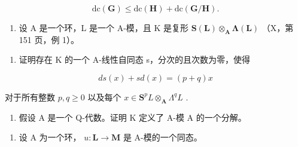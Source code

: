 \[
\mathrm{dc} (\mathbf {G}) \leqslant \mathrm{dc} (\mathbf {H}) + \mathrm{dc} (\mathbf {G} / \mathbf {H}).
\]


\begin{enumerate}
\def\labelenumi{\arabic{enumi})}
\tightlist
\item
  设 A 是一个环，L 是一个 A-模，且 K 是复形 \(\mathbf{S}(\mathbf{L})\otimes_{\mathbf{A}}\symbf{\Lambda}(\mathbf{L})\) （X，第 151 页，例 1）。
\end{enumerate}

\begin{enumerate}
\def\labelenumi{\alph{enumi})}
\tightlist
\item
  证明存在 K 的一个 A-线性自同态 s，分次的且次数为零，使得
\end{enumerate}

\[
d s (x) + s d (x) = (p + q) x
\]

对于所有整数 \(p, q \geqslant 0\) 以及每个 \(x \in \mathbf{S}^p L \otimes_{\mathbf{A}} \Lambda^q L\) .

\begin{enumerate}
\def\labelenumi{\alph{enumi})}
\setcounter{enumi}{1}
\tightlist
\item
  假设 A 是一个 Q-代数。证明 K 定义了 A-模 A 的一个分解。
\end{enumerate}

\begin{enumerate}
\def\labelenumi{\arabic{enumi})}
\setcounter{enumi}{1}
\tightlist
\item
  设 A 为一个环， \(u: \mathbf{L} \to \mathbf{M}\) 是 A-模的一个同态。
\end{enumerate}


